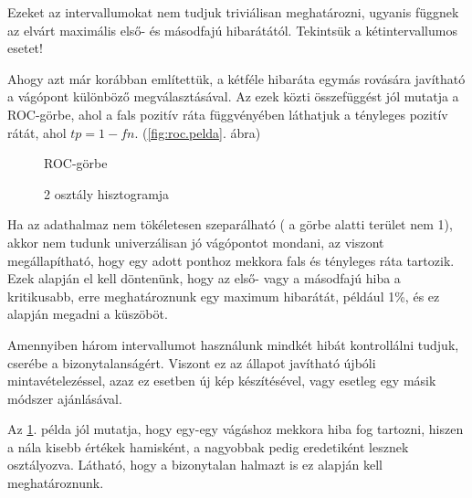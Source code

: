 Ezeket az intervallumokat nem tudjuk triviálisan meghatározni, ugyanis függnek az 
elvárt maximális első- és másodfajú hibarátától. Tekintsük a kétintervallumos esetet!

Ahogy azt már korábban említettük, a kétféle hibaráta egymás rovására javítható a 
vágópont különböző megválasztásával. Az ezek közti összefüggést jól mutatja a 
ROC-görbe, ahol a fals pozitív ráta függvényében láthatjuk a tényleges
pozitív rátát, ahol $ tp = 1 - fn $. (\ref{fig:roc.pelda}. ábra)




\begin{figure}[ht]
	
	
	\begin{minipage}[c]{0.5\linewidth}
		\centering
		
		\caption{ROC-görbe}
		\label{fig:roc.pelda}
		
	\end{minipage}\hfill
	\begin{minipage}[c]{0.5\linewidth}
		\centering
		
		\caption{2 osztály hisztogramja}
		\label{fig:hist.pelda}
		
	\end{minipage}
	
\end{figure}
%	


Ha az adathalmaz nem tökéletesen szeparálható ( a görbe alatti terület nem 1), akkor
nem tudunk univerzálisan jó vágópontot mondani, az viszont megállapítható, hogy egy adott ponthoz 
mekkora fals és tényleges ráta tartozik. Ezek alapján el kell döntenünk, hogy az 
első- vagy a másodfajú hiba a kritikusabb, erre meghatároznunk egy maximum hibarátát,
például 1\%, és ez alapján megadni a küszöböt.


Amennyiben három intervallumot használunk mindkét hibát kontrollálni tudjuk, cserébe a 
bizonytalanságért. Viszont ez az állapot javítható újbóli mintavételezéssel, azaz 
ez esetben új kép készítésével, vagy esetleg egy másik módszer ajánlásával.


Az \ref{fig:hist.pelda}. példa jól mutatja, hogy egy-egy vágáshoz mekkora hiba fog
tartozni, hiszen a nála kisebb értékek hamisként, a nagyobbak pedig eredetiként
lesznek osztályozva. Látható, hogy a bizonytalan halmazt is ez alapján kell meghatároznunk.










